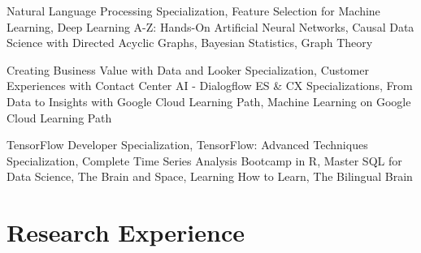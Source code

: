 \documentclass[letterpaper]{deedy-resume} %
\begin{document}
\sectionspace %
\begin{tightitemize}
\item Natural Language Processing Specialization, Feature Selection for Machine Learning, Deep Learning A-Z: Hands-On Artificial Neural Networks, Causal Data Science with Directed Acyclic Graphs, Bayesian Statistics, Graph Theory
\item Creating Business Value with Data and Looker Specialization, Customer Experiences with Contact Center AI - Dialogflow ES & CX Specializations, From Data to Insights with Google Cloud Learning Path, Machine Learning on Google Cloud Learning Path
\item TensorFlow Developer Specialization, TensorFlow: Advanced Techniques Specialization, Complete Time Series Analysis Bootcamp in R, Master SQL for Data Science, The Brain and Space, Learning How to Learn, The Bilingual Brain 
\end{tightitemize}
\sectionspace %

\section{Research Experience}
\end{document}
